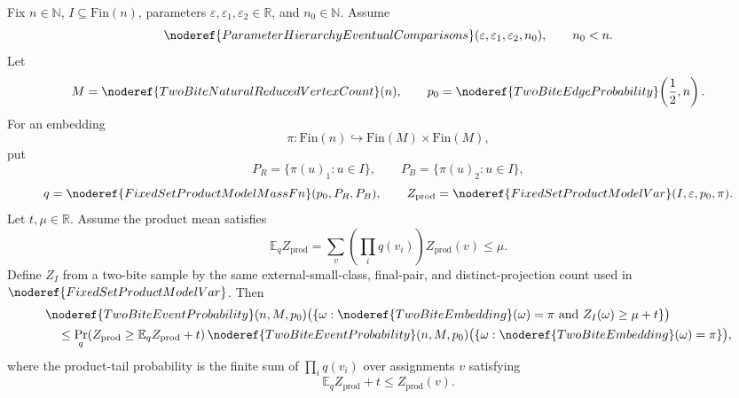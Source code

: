 \begin{helper}
Fix \(n\in\mathbb N\), \(I\subseteq\mathrm{Fin}(n)\), parameters
\(\varepsilon,\varepsilon_1,\varepsilon_2\in\mathbb R\), and
\(n_0\in\mathbb N\).  Assume
\[
\noderef{ParameterHierarchyEventualComparisons}
  (\varepsilon,\varepsilon_1,\varepsilon_2,n_0),\qquad n_0<n.
\]
Let
\[
M=\noderef{TwoBiteNaturalReducedVertexCount}(n),\qquad
p_0=\noderef{TwoBiteEdgeProbability}\!\left(\frac12,n\right).
\]
For an embedding
\[
\pi:\mathrm{Fin}(n)\hookrightarrow\mathrm{Fin}(M)\times\mathrm{Fin}(M),
\]
put
\[
P_R=\{\pi(u)_1:u\in I\},\qquad P_B=\{\pi(u)_2:u\in I\},
\]
\[
q=\noderef{FixedSetProductModelMassFn}(p_0,P_R,P_B),
\qquad
Z_{\mathrm{prod}}=\noderef{FixedSetProductModelVar}(I,\varepsilon,p_0,\pi).
\]
Let \(t,\mu\in\mathbb R\).  Assume the product mean satisfies
\[
\mathbb E_q Z_{\mathrm{prod}}
=\sum_v\left(\prod_i q(v_i)\right)Z_{\mathrm{prod}}(v)
\le \mu.
\]
Define \(Z_I\) from a two-bite sample by the same external-small-class,
final-pair, and distinct-projection count used in
\(\noderef{FixedSetProductModelVar}\).  Then
\[
\begin{aligned}
&\noderef{TwoBiteEventProbability}(n,M,p_0)
 \bigl(\{\omega:\noderef{TwoBiteEmbedding}(\omega)=\pi
   \text{ and } Z_I(\omega)\ge \mu+t\}\bigr)\\
&\quad\le
\Pr_q\!\left(Z_{\mathrm{prod}}\ge
  \mathbb E_qZ_{\mathrm{prod}}+t\right)
\noderef{TwoBiteEventProbability}(n,M,p_0)
 \bigl(\{\omega:\noderef{TwoBiteEmbedding}(\omega)=\pi\}\bigr),
\end{aligned}
\]
where the product-tail probability is the finite sum of
\(\prod_iq(v_i)\) over assignments \(v\) satisfying
\[
\mathbb E_qZ_{\mathrm{prod}}+t\le Z_{\mathrm{prod}}(v).
\]
\end{helper}

